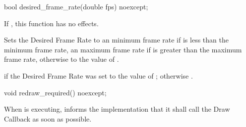 \begin{itemdecl}
bool desired_frame_rate(double fps) noexcept;
\end{itemdecl}
\begin{itemdescr}
\pnum
\effects
If , this function has no effects.

\pnum
Sets the Desired Frame Rate to an  minimum frame rate if  is less than the minimum frame rate, an  maximum frame rate if  is greater than the maximum frame rate, otherwise to the value of .

\pnum
\returns
{} if the Desired Frame Rate was set to the value of ; otherwise .
\end{itemdescr}

\begin{itemdecl}
void redraw_required() noexcept;
\end{itemdecl}
\begin{itemdescr}
\pnum
\effects
When  is executing, informs the implementation that it shall call the Draw Callback as soon as possible.
\end{itemdescr}

